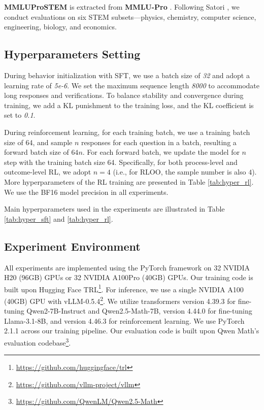 \textbf{MMLUProSTEM} is extracted from \textbf{MMLU-Pro} \cite{wang2024mmlu}. Following Satori \cite{shen2025satori}, we conduct evaluations on six STEM subsets—physics, chemistry, computer science, engineering, biology, and economics.



\subsection{Hyperparameters Setting}
\label{ap:hyper}

During behavior initialization with SFT, we use a batch size of \textit{32} and adopt a learning rate of \textit{5e-6}. We set the maximum sequence length \textit{8000} to accommodate long responses and verifications. To balance stability and convergence during training, we add a KL punishment to the training loss, and the KL coefficient is set to \textit{0.1}. 

During reinforcement learning, 
for each training batch, we use a training batch size of 64, and sample $n$ responses for each question in a batch, resulting a forward batch size of $64n$. For each forward batch, we update the model for $n$ step with the training batch size 64. Specifically, for both process-level and outcome-level RL, we adopt $n=4$ (i.e., for RLOO, the sample number is also $4$). More hyperparameters of the RL training are presented in Table \ref{tab:hyper_rl}. We use the BF16 model precision in all experiments.

Main hyperparameters used in the experiments are illustrated in Table \ref{tab:hyper_sft} and \ref{tab:hyper_rl}.

\subsection{Experiment Environment}

All experiments are implemented using the PyTorch framework on 32 NVIDIA H20 (96GB) GPUs or 32 NVIDIA A100Pro (40GB) GPUs. Our training code is built upon Hugging Face TRL\footnote{\url{https://github.com/huggingface/trl}}. For inference, we use a single NVIDIA A100 (40GB) GPU with vLLM-0.5.4\footnote{\url{https://github.com/vllm-project/vllm}}. 
We utilize transformers version 4.39.3 for fine-tuning Qwen2-7B-Instruct and Qwen2.5-Math-7B, version 4.44.0 for fine-tuning Llama-3.1-8B, and version 4.46.3 for reinforcement learning. We use PyTorch 2.1.1 across our training pipeline.
Our evaluation code is built upon Qwen Math's evaluation codebase\footnote{\url{https://github.com/QwenLM/Qwen2.5-Math}}.

